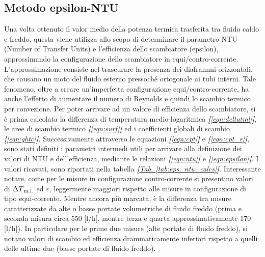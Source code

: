 \documentclass[a4paper,10pt]{article}                                                                                       %
\begin{document}
\subsection{Metodo epsilon-NTU}                                                                                             %
\label{subsec:epsntu_meth}                                                                                                  %
  Una volta ottenuto il valor medio della potenza termica trasferita tra fluido caldo e freddo, questa viene utilizza allo
  scopo di determinare il parametro NTU (Number of Transfer Units) e l'efficienza dello scambiatore (epsilon),
  approssimando la configurazione dello scambiatore in equi/contro-corrente. L'approssimazione consiste nel trascurare la
  presenza dei diaframmi orizzontali, che causano un moto del fluido esterno pressoché ortogonale ai tubi interni. Tale
  fenomeno, oltre a creare un'imperfetta configurazione equi/contro-corrente, ha anche l'effetto di aumentare il numero
  di Reynolds e quindi lo scambio termico per convezione. Per poter arrivare ad un valore di efficienza dello scambiatore,
  si è prima calcolata la differenza di temperatura medio-logaritmica \textit{\textbf{[}\ref{eqn:deltatml}\textbf{]}}, le
  aree di scambio termico \textit{\textbf{[}\ref{eqn:surf}\textbf{]}} ed i coefficienti globali di scambio
  \textit{\textbf{[}\ref{eqn:ghtc}\textbf{]}}. Successivamente attraverso le equazioni
  \textit{\textbf{[}\ref{eqn:cpt}\textbf{]}} e \textit{\textbf{[}\ref{eqn:cpt_r}\textbf{]}}, sono stati definiti i
  parametri intermedi utili per arrivare alla definizione dei valori di NTU e dell'efficienza, mediante le relazioni
  \textit{\textbf{[}\ref{eqn:ntu}\textbf{]}} e \textit{\textbf{[}\ref{eqn:epsilon}\textbf{]}}. I valori ricavati, sono
  riportati nella tabella \textit{\textbf{[}\hyperref[tab:eps_ntu_calcs]{Tab. }\ref{tab:eps_ntu_calcs}\textbf{]}}.
  Interessante notare, come per le misure in configurazione contro-corrente si presentino valori di
  $\Delta{T\textsubscript{m.l.}}$ ed $\varepsilon$, leggermente maggiori rispetto alle misure in configurazione di tipo
  equi-corrente. Mentre ancora più marcata, è la differenza tra misure caratterizzate da alte o basse portate volumetriche
  di fluido freddo (prima e seconda misura circa 550 [l/h], mentre terza e quarta approssimativamente 170 [l/h]).
  In particolare per le prime due misure (alte portate di fluido freddo), si notano valori di scambio ed efficienza
  drammaticamente inferiori rispetto a quelli delle ultime due (basse portate di fluido freddo).
\end{document}
